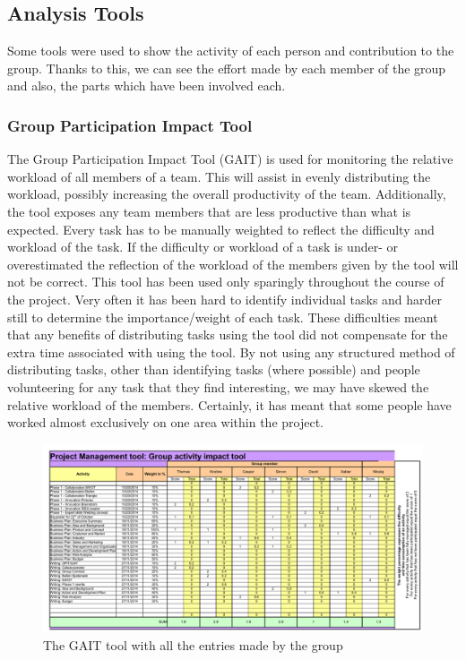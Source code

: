 
\subsection{Analysis Tools}
Some tools were used to show the activity of each person and contribution to the group. Thanks to this, we can see the effort made by each member of the group and also, the parts which have been involved each.
\subsubsection{Group Participation Impact Tool}
 The Group Participation Impact Tool (GAIT) is used for monitoring the relative workload of all members of a team. This will assist in evenly distributing the workload, possibly increasing the overall productivity of the team. Additionally, the tool exposes any team members that are less productive than what is expected. Every task has to be manually weighted to reflect the difficulty and workload of the task. If the difficulty or workload of a task is under- or overestimated the reflection of the workload of the members given by the tool will not be correct.
This tool has been used only sparingly throughout the course of the project. Very often it has been hard to identify individual tasks and harder still to determine the importance/weight of each task. These difficulties meant that any benefits of distributing tasks using the tool did not compensate for the extra time associated with using the tool. 
 By not using any structured method of distributing tasks, other than identifying tasks (where possible) and people volunteering for any task that they find interesting, we may have skewed the relative workload of the members. Certainly, it has meant that some people have worked almost exclusively on one area within the project.



\begin{landscape}
	\begin{figure}[h!]
		\includegraphics[scale=1.25]{./graphics/GAIT}
		\caption{The GAIT tool with all the entries made by the group}
		\label{fig:GAIT}
	\end{figure}
\end{landscape}





